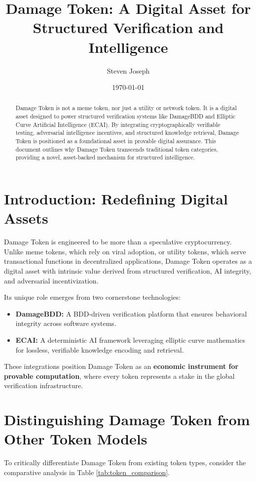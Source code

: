 \documentclass{article}
\title{Damage Token: A Digital Asset for Structured Verification and Intelligence}
\author{Steven Joseph}
\date{\today}
\begin{document}
\maketitle

\begin{abstract}
Damage Token is not a meme token, nor just a utility or network token. It is a digital asset designed to power structured verification systems like DamageBDD and Elliptic Curve Artificial Intelligence (ECAI). By integrating cryptographically verifiable testing, adversarial intelligence incentives, and structured knowledge retrieval, Damage Token is positioned as a foundational asset in provable digital assurance. This document outlines why Damage Token transcends traditional token categories, providing a novel, asset-backed mechanism for structured intelligence.
\end{abstract}

\section{Introduction: Redefining Digital Assets}
Damage Token is engineered to be more than a speculative cryptocurrency. Unlike meme tokens, which rely on viral adoption, or utility tokens, which serve transactional functions in decentralized applications, Damage Token operates as a digital asset with intrinsic value derived from structured verification, AI integrity, and adversarial incentivization.

Its unique role emerges from two cornerstone technologies:
\begin{itemize}
    \item \textbf{DamageBDD:} A BDD-driven verification platform that ensures behavioral integrity across software systems.
    \item \textbf{ECAI:} A deterministic AI framework leveraging elliptic curve mathematics for lossless, verifiable knowledge encoding and retrieval.
\end{itemize}
These integrations position Damage Token as an \textbf{economic instrument for provable computation}, where every token represents a stake in the global verification infrastructure.

\section{Distinguishing Damage Token from Other Token Models}

To critically differentiate Damage Token from existing token types, consider the comparative analysis in Table \ref{tab:token_comparison}.
\end{document}
